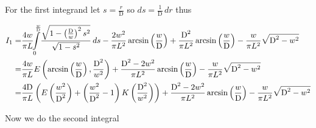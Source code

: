For the first integrand let $s=\frac{r}{\text{D}}$ so $ds=\frac{1}{\text{D}}\,dr$ thus 

\begin{align*}
I_{1}=&
\frac{4 w}{\pi  L }\!\!
\intop_{0}^{\frac{w}{\text{D}}}\!
\frac{\sqrt{1-\left(\frac{\text{D}}{w}\right)^{2}s^{2}}}{\sqrt{1-s^2}}
\,ds
-\frac{2 w^2}{\pi  L^2 }
\arcsin\left(\frac{w}{\text{D}}\right)
+\frac{\text{D}^{2}}{\pi  L^2 }\arcsin\left(\frac{w}{\text{D}}\right)
-\frac{w}{\pi  L^2}\sqrt{\text{D}^2-w^2}\\
=&\frac{4 w}{\pi  L }E\left(\arcsin\left(\frac{w}{\text{D}}\right),\frac{\text{D}^{2}}{w^{2}}\right)
+\frac{\text{D}^{2}-2 w^2}{\pi  L^2 }\arcsin\left(\frac{w}{\text{D}}\right)
-\frac{w}{\pi  L^2}\sqrt{\text{D}^2-w^2}\\
=&\frac{4 \text{D}}{\pi  L }
\left(E\left(\frac{w^2}{\text{D}^2}\right)+\left(\frac{w^2}{\text{D}^2}-1\right)K\left(\frac{\text{D}^2}{w^2}\right)\right)
+\frac{\text{D}^{2}-2 w^2}{\pi  L^2 }\arcsin\left(\frac{w}{\text{D}}\right)
-\frac{w}{\pi  L^2}\sqrt{\text{D}^2-w^2}\\
\end{align*}

Now we do the second integral

